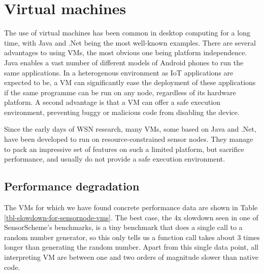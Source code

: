 \section{Virtual machines}
The use of virtual machines has been common in desktop computing for a long time, with Java and .Net being the most well-known examples. There are several advantages to using VMs, the most obvious one being platform independence. Java enables a vast number of different models of Android phones to run the same applications. In a heterogenous environment as IoT applications are expected to be, a VM can significantly ease the deployment of these applications if the same programme can be run on any node, regardless of its hardware platform. A second advantage is that a VM can offer a safe execution environment, preventing buggy or malicious code from disabling the device.


Since the early days of WSN research, many VMs, some based on Java and .Net, have been developed to run on resource-constrained sensor nodes. They manage to pack an impressive set of features on such a limited platform, but sacrifice performance, and usually do not provide a safe execution environment.

\subsection{Performance degradation}
\label{sec-introduction-performance}
The VMs for which we have found concrete performance data are shown in Table \ref{tbl-slowdown-for-sensornode-vms}. The best case, the 4x slowdown seen in one of SensorScheme's benchmarks, is a tiny benchmark that does a single call to a random number generator, so this only tells us a function call takes about 3 times longer than generating the random number. Apart from this single data point, all interpreting VM are between one and two orders of magnitude slower than native code.

